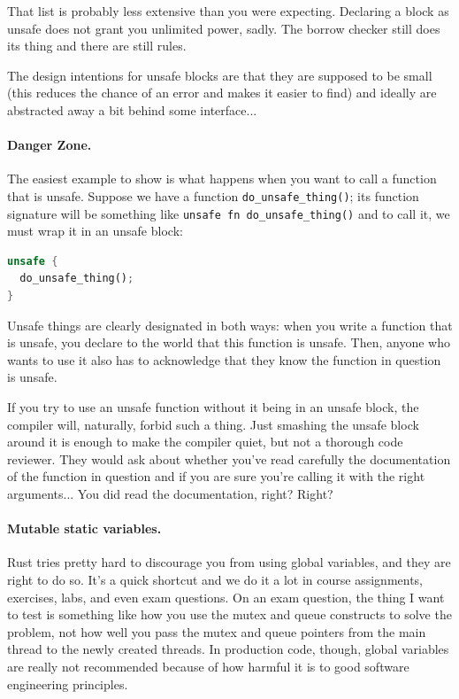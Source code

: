 \documentclass[a4paper]{report}
\begin{document}
That list is probably less extensive than you were expecting. Declaring a block as unsafe does not grant you unlimited power, sadly. The borrow checker still does its thing and there are still rules. 

The design intentions for unsafe blocks are that they are supposed to be small (this reduces the chance of an error and makes it easier to find) and ideally are abstracted away a bit behind some interface...

\paragraph{Danger Zone.} The easiest example to show is what happens when you want to call a function that is unsafe. Suppose we have a function \texttt{do\_unsafe\_thing()}; its function signature will be something like \texttt{unsafe fn do\_unsafe\_thing()} and to call it, we must wrap it in an unsafe block:

\begin{lstlisting}[language=Rust]
unsafe {
  do_unsafe_thing();
}
\end{lstlisting}
Unsafe things are clearly designated in both ways: when you write a function that is unsafe, you declare to the world that this function is unsafe. Then, anyone who wants to use it also has to acknowledge that they know the function in question is unsafe. 

If you try to use an unsafe function without it being in an unsafe block, the compiler will, naturally, forbid such a thing. Just smashing the unsafe block around it is enough to make the compiler quiet, but not a thorough code reviewer. They would ask about whether you've read carefully the documentation of the function in question and if you are sure you're calling it with the right arguments... You did read the documentation, right? Right?

\paragraph{Mutable static variables.} Rust tries pretty hard to discourage you from using global variables, and they are right to do so. It's a quick shortcut and we do it a lot in course assignments, exercises, labs, and even exam questions. On an exam question, the thing I want to test is something like how you use the mutex and queue constructs to solve the problem, not how well you pass the mutex and queue pointers from the main thread to the newly created threads. In production code, though, global variables are really not recommended because of how harmful it is to good software engineering principles. 
\end{document}

